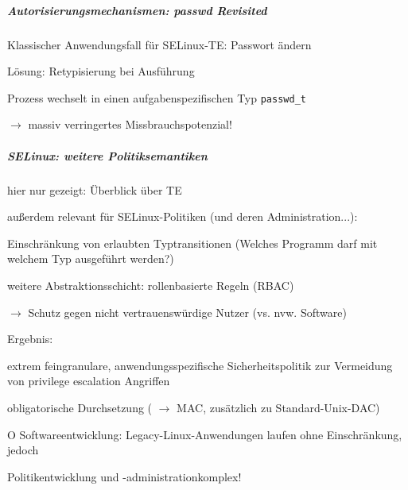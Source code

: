 \documentclass[a4paper]{article}
\newcommand{\cmark}{\ding{51}}
\newcommand{\xmark}{\ding{55}}
\begin{document}
\begin{multicols}{3}
    \subparagraph{Autorisierungsmechanismen: passwd
        Revisited}

    Klassischer Anwendungsfall für SELinux-TE: Passwort ändern

    Lösung: Retypisierung bei Ausführung

    \begin{itemize*}
        \item
        Prozess wechselt in einen aufgabenspezifischen Typ \texttt{passwd\_t}
        \item
        $\rightarrow$ massiv verringertes
        Missbrauchspotenzial!
    \end{itemize*}


    \subparagraph{SELinux: weitere
        Politiksemantiken}

    \begin{itemize*}
        \item
        hier nur gezeigt: Überblick über TE
        \item
        außerdem relevant für SELinux-Politiken (und deren Administration...):
        \begin{itemize*}
            \item Einschränkung von erlaubten Typtransitionen (Welches Programm darf mit welchem Typ ausgeführt werden?)
            \item weitere Abstraktionsschicht: rollenbasierte Regeln (RBAC)
            \item[$\rightarrow$] Schutz gegen nicht vertrauenswürdige Nutzer (vs. nvw. Software)
        \end{itemize*}
        \item
        Ergebnis:
        \begin{itemize*}
            \item \cmark extrem feingranulare, anwendungsspezifische Sicherheitspolitik zur Vermeidung von privilege escalation Angriffen
            \item \cmark obligatorische Durchsetzung ( $\rightarrow$ MAC, zusätzlich zu Standard-Unix-DAC)
            \item O Softwareentwicklung: Legacy-Linux-Anwendungen laufen ohne Einschränkung, jedoch
            \item \xmark Politikentwicklung und -administrationkomplex!
        \end{itemize*}
    \end{itemize*}



\end{multicols}
\end{document}
